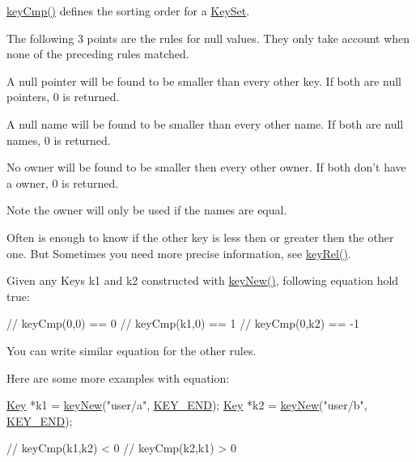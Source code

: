 \hyperlink{group__keytest_gaf6e66e12fe04d535a5d1c8218ced803e}{key\-Cmp()} defines the sorting order for a \hyperlink{classkdb_1_1KeySet}{Key\-Set}.

The following 3 points are the rules for null values. They only take account when none of the preceding rules matched.


\begin{DoxyItemize}
\item A null pointer will be found to be smaller than every other key. If both are null pointers, 0 is returned.
\end{DoxyItemize}


\begin{DoxyItemize}
\item A null name will be found to be smaller than every other name. If both are null names, 0 is returned.
\end{DoxyItemize}


\begin{DoxyItemize}
\item No owner will be found to be smaller then every other owner. If both don't have a owner, 0 is returned.
\end{DoxyItemize}

\begin{DoxyNote}{Note}
the owner will only be used if the names are equal.
\end{DoxyNote}
Often is enough to know if the other key is less then or greater then the other one. But Sometimes you need more precise information, see \hyperlink{group__keytest_ga6bb0f95ac34ce9c42d61bb35a76139d0}{key\-Rel()}.

Given any Keys k1 and k2 constructed with \hyperlink{group__key_gaf6893c038b3ebee90c73a9ea8356bebf}{key\-New()}, following equation hold true\-:


\begin{DoxyCode}
\textcolor{comment}{// keyCmp(0,0) == 0}
\textcolor{comment}{// keyCmp(k1,0) ==  1}
\textcolor{comment}{// keyCmp(0,k2) == -1}
\end{DoxyCode}


You can write similar equation for the other rules.

Here are some more examples with equation\-: 
\begin{DoxyCode}
\hyperlink{classkdb_1_1Key_a5679f5cae63caddd64a60388b9cc77fa}{Key} *k1 = \hyperlink{group__key_gaf6893c038b3ebee90c73a9ea8356bebf}{keyNew}(\textcolor{stringliteral}{"user/a"}, \hyperlink{group__key_gga91fb3178848bd682000958089abbaf40aa8adb6fcb92dec58fb19410eacfdd403}{KEY\_END});
\hyperlink{classkdb_1_1Key_a5679f5cae63caddd64a60388b9cc77fa}{Key} *k2 = \hyperlink{group__key_gaf6893c038b3ebee90c73a9ea8356bebf}{keyNew}(\textcolor{stringliteral}{"user/b"}, \hyperlink{group__key_gga91fb3178848bd682000958089abbaf40aa8adb6fcb92dec58fb19410eacfdd403}{KEY\_END});

\textcolor{comment}{// keyCmp(k1,k2) < 0}
\textcolor{comment}{// keyCmp(k2,k1) > 0}
\end{DoxyCode}



